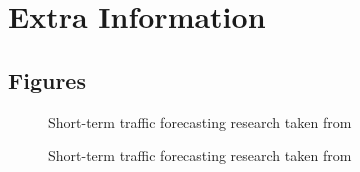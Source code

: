 \chapter{Extra Information}

\section{Figures}
\begin{figure}[h]
	\caption{Short-term traffic forecasting research taken from \cite{Vlahogianni20143}}
	\label{fig:Vlahogianni201431}
\end{figure}

\begin{figure}[ht]
	\caption{Short-term traffic forecasting research taken from \cite{Vlahogianni20143}}
	\label{fig:Vlahogianni201432}
\end{figure}

